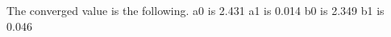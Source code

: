 \documentclass{article}
\begin{document}
The converged value is the following.
a0 is 2.431
a1 is 0.014
b0 is 2.349
b1 is 0.046
\end{document}
